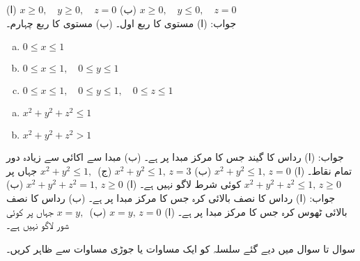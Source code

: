 (ا) 
$x\ge 0,\quad y\ge 0,\quad z=0$\quad
(ب) $x\ge 0,\quad y\le 0,\quad z=0$\\
جواب:\quad
(ا) مستوی  کا ربع اول۔ (ب) مستوی  کا ربع چہارم۔
\begin{enumerate}[a.]
\item
$0\le x\le 1$
\item
$0\le x\le 1,\quad 0\le y\le 1$
\item
$0\le x\le 1,\quad 0\le y\le 1,\quad 0\le z\le 1$
\end{enumerate}
\begin{enumerate}[a.]
\item
$x^2+y^2+z^2\le 1$
\item
$x^2+y^2+z^2> 1$
\end{enumerate}
جواب:\quad
(ا) رداس  کا گیند جس کا مرکز مبدا پر ہے۔ (ب) مبدا سے  اکائی سے زیادہ دور تمام نقاط۔
(ا) 
$x^2+y^2\le 1,\, z=0$\quad
(ب)
$x^2+y^2\le 1,\, z=3$\quad
(ج) 
$x^2+y^2\le 1,\,$
جہاں  پر کوئی شرط لاگو نہیں ہے۔
(ا)
$x^2+y^2+z^2=1,\, z\ge 0$
(ب)
$x^2+y^2+z^2\le 1,\, z\ge 0$\\
جواب:\quad
(ا) رداس  کا نصف بالائی کرہ جس کا مرکز مبدا پر ہے۔ (ب)  رداس  کا نصف بالائی ٹھوس کرہ جس کا مرکز مبدا پر ہے۔
(ا) 
$x=y,\, z=0$
 (ب)
$x=y,\,$ 
جہاں  پر کوئی شور لاگو نہیں ہے۔

سوال  تا سوال  میں دیے گئے سلسلہ کو ایک مساوات یا جوڑی مساوات سے ظاہر کریں۔

